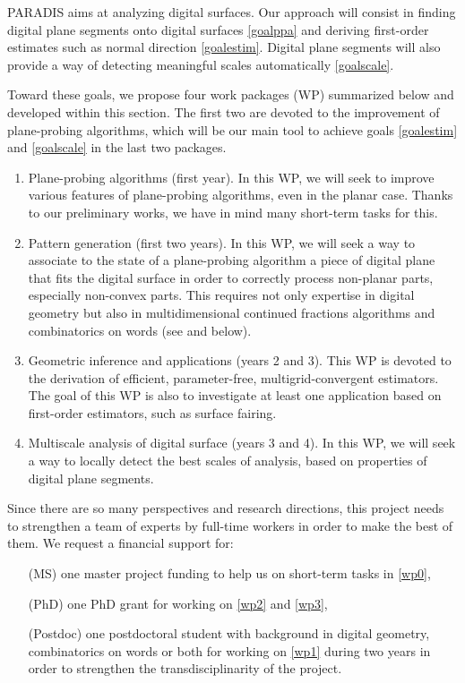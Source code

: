PARADIS aims at analyzing digital surfaces. Our approach will consist in finding
digital plane segments onto digital surfaces \ref{goalppa} and deriving first-order
estimates such as normal direction \ref{goalestim}. Digital plane segments will
also provide a way of detecting meaningful scales automatically \ref{goalscale}.

Toward these goals, we propose four work packages (WP) summarized below and
developed within this section. The first two are devoted to the improvement of
plane-probing algorithms, which will be our main tool to achieve goals \ref{goalestim}
and \ref{goalscale} in the last two packages. 

\begin{enumerate} [label=(W\arabic*),start=0]
\item Plane-probing algorithms (first year). In this WP, we will seek to
  improve various features of plane-probing algorithms, even in the
  planar case. Thanks to our preliminary works, we have in mind many short-term
  tasks for this.  \label{wp0}
\item Pattern generation (first two years). In this WP, we will seek a way to associate
  to the state of a plane-probing algorithm a piece of digital plane
  that fits the digital surface in order to correctly process non-planar parts,
  especially non-convex parts. This requires not only expertise in
  digital geometry but also in multidimensional continued fractions
  algorithms and combinatorics on words (see  and below).  \label{wp1} 
\item Geometric inference and applications (years 2 and 3). This WP is devoted
  to the derivation of efficient, parameter-free, multigrid-convergent estimators.
  The goal of this WP is also to investigate at least one application based on
  first-order estimators, such as surface fairing. \label{wp2} 
\item Multiscale analysis of digital surface (years 3 and 4). In this WP, we will
  seek a way to locally detect the best scales of analysis, based on properties
  of digital plane segments. \label{wp3}
\end{enumerate}

Since there are so many perspectives and research directions, this project needs
to strengthen a team of experts by full-time workers in order to make the best of them.
We request a financial support for: 
\begin{itemize}
\item[(MS)] one master project funding to help us on short-term tasks in \ref{wp0},
\item[(PhD)] one PhD grant for working on \ref{wp2} and \ref{wp3},
\item[(Postdoc)] one postdoctoral student with background in digital geometry,
  combinatorics on words or both for working on \ref{wp1} during two years
  in order to strengthen the transdisciplinarity of the project. 
\end{itemize}


